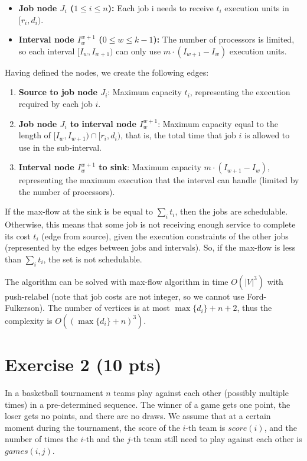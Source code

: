 \documentclass[a4paper]{article}
\begin{document}
\begin{itemize}
\item \textbf{Job node $J_i$ ($1 \le i \le n$):} Each job i needs to receive $t_i$ execution units in $[r_i, d_i)$.
\item \textbf{Interval node $I_w^{w+1}$ ($0 \le w \le k-1$):} The number of processors is limited, so each interval $[I_w, I_{w+1})$ can only use $m \cdot (I_{w+1} - I_w)$ execution units.  
\end{itemize}

\noindent Having defined the nodes, we create the following edges:
\begin{enumerate}
\item \textbf{Source to job node $J_i$}: Maximum capacity $t_i$, representing the execution required by each job $i$.
\item \textbf{Job node $J_i$ to interval node $I_w^{w+1}$}: Maximum capacity equal to the length of $[I_w, I_{w+1}) \cap [r_i, d_i)$, that is, the total time that job $i$ is allowed to use in the sub-interval.
\item \textbf{Interval node $I_w^{w+1}$ to sink}: Maximum capacity $m \cdot (I_{w+1} - I_w)$, representing the maximum execution that the interval can handle (limited by the number of processors).
\end{enumerate}


If the max-flow at the sink is be equal to $\sum_{i} t_i$, then the jobs are schedulable. Otherwise, this means that some job is not receiving enough service to complete its cost $t_i$ (edge from source), given the execution constraints of the other jobs (represented by the edges between jobs and intervals). So, if the max-flow is less than $\sum_{i} t_i$, the set is not schedulable.

The algorithm can be solved with max-flow algorithm in time $O(|V|^3)$ with push-relabel (note that job costs are not integer, so we cannot use Ford-Fulkerson).
The number of vertices is at most $\max\{d_i\} + n + 2$, thus the complexity is $O((\max\{d_i\} + n)^3)$.


\section*{Exercise 2 (10 pts)}

In a basketball tournament $n$ teams play against each other (possibly multiple times) in a pre-determined sequence. The winner of a game gets one point, the loser gets no points, and there are no draws. We assume that at a certain moment during the tournament, the score of the $i$-th team is ${score}(i)$, and the number of times the
$i$-th and the $j$-th team still need to play against each other is ${games}(i, j)$.
\end{document}

